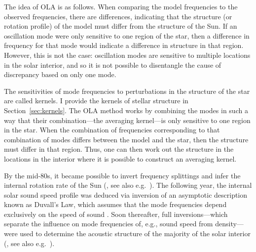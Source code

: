 The idea of OLA is as follows. 
When comparing the model frequencies to the observed frequencies, there are differences, indicating that the structure (or rotation profile) of the model must differ from the structure of the Sun. 
If an oscillation mode were only sensitive to one region of the star, then a difference in frequency for that mode would indicate a difference in structure in that region. 
However, this is not the case: oscillation modes are sensitive to multiple locations in the solar interior, and so it is not possible to disentangle the cause of discrepancy based on only one mode. 

The sensitivities of mode frequencies to perturbations in the structure of the star are called kernels. 
I provide the kernels of stellar structure in Section~\ref{sec:kernels}. 
The OLA method works by combining the modes in such a way that their combination---the averaging kernel---is only sensitive to one region in the star. 
When the combination of frequencies corresponding to that combination of modes differs between the model and the star, then the structure must differ in that region. 
Thus, one can then work out the structure in the locations in the interior where it is possible to construct an averaging kernel. 


By the mid-80s, it became possible to invert frequency splittings and infer the internal rotation rate of the Sun (\citealt{1984Natur.310...22D}, see also e.g.~\citealt{1998ApJ...505..390S, 2009LRSP....6....1H}). 
The following year, the internal solar sound speed profile was deduced via inversion of an asymptotic description known as Duvall's Law, which assumes that the mode frequencies depend exclusively on the speed of sound \citep{1985Natur.315..378C}. 
Soon thereafter, full inversions---which separate the influence on mode frequencies of, e.g., sound speed from density---were used to determine the acoustic structure of the majority of the solar interior (\citealt{1985SoPh..100...65G}, see also e.g.~\citealt{1990MNRAS.244..542D, GoughThompson1991, 1991ARA&A..29..627G, 1994a&as..107..421a, 2009ApJ...699.1403B}). 

